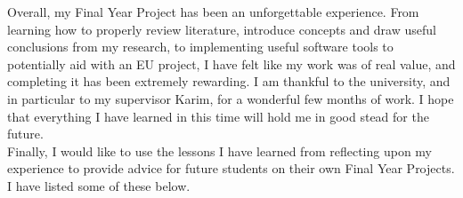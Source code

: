 Overall, my Final Year Project has been an unforgettable experience. From learning how to properly review literature, introduce concepts and draw useful conclusions from my research, to implementing useful software tools to potentially aid with an EU project, I have felt like my work was of real value, and completing it has been extremely rewarding. I am thankful to the university, and in particular to my supervisor Karim, for a wonderful few months of work. I hope that everything I have learned in this time will hold me in good stead for the future. \\

Finally, I would like to use the lessons I have learned from reflecting upon my experience to provide advice for future students on their own Final Year Projects. I have listed some of these below. 


